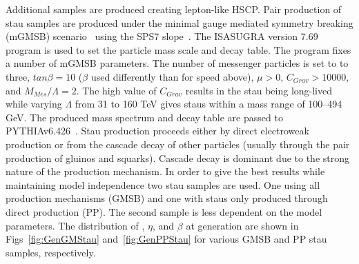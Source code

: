 Additional samples are produced creating lepton-like HSCP. Pair production of stau samples
are produced under the minimal gauge mediated symmetry breaking (mGMSB) scenario~\cite{Giudice:1998bp} using the SPS7 slope~\cite{Allanach:2002nj}.
The ISASUGRA version 7.69~\cite{Paige:2003mg} program is used to set the particle mass scale and decay table. 
The program fixes a number of mGMSB parameters. The number of messenger particles 
is set to to three, $tan \beta = 10$ ($\beta$ used differently than for speed above), $\mu>0$, $C_{Grav}>10000$, and $M_{Mes}/\Lambda=2$.
The high value of $C_{Grav}$ results in the stau being long-lived while varying $\Lambda$ from 31 to 160 TeV gives staus within a mass range of 100--494 GeV. The produced
mass spectrum and decay table are passed to PYTHIAv6.426~\cite{Sjostrand:2006za}. Stau production proceeds either by direct electroweak production or from the cascade
decay of other particles (usually through the pair production of gluinos and squarks). Cascade decay is dominant due to the strong nature of the production mechanism.
In order to give the best results while maintaining model independence two stau samples are used. One using all production mechanisms (GMSB) and one with staus only
produced through direct production (PP). The second sample is less dependent on the model parameters. The distribution of \pt, $\eta$, and $\beta$ at generation
are shown in Figs~\ref{fig:GenGMStau} and~\ref{fig:GenPPStau} for various GMSB and PP stau samples, respectively.

